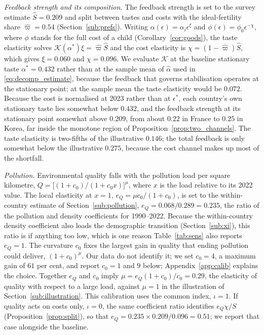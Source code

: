 \documentclass[11pt]{article}
\begin{document}
\emph{Feedback strength and its composition.} The feedback strength is set to the survey estimate
$\hat S=0.209$ and split between tastes and costs with the ideal-fertility share $\hat\varpi=0.54$
(Section~\ref{sub:prefs}). Writing $\alpha(\epsilon)=\alpha_i\epsilon^{\xi}$ and
$\phi(\epsilon)=\phi_0\epsilon^{-\chi}$, where $\phi$ stands for the full cost of a child
(Corollary~\ref{cor:goods}), the taste elasticity solves $\mathcal{K}(\alpha^\ast)\xi=\hat\varpi\hat S$
and the cost elasticity is $\chi=(1-\hat\varpi)\hat S$, which gives $\xi=0.060$ and $\chi=0.096$. We
evaluate $\mathcal{K}$ at the baseline stationary taste $\alpha^\ast=0.432$ rather than at the sample mean
of $\hat\alpha$ used in \eqref{eq:decomp_estimate}, because the feedback that governs stabilisation
operates at the stationary point; at the sample mean the taste elasticity would be $0.072$. Because the
cost is normalised at 2023 rather than at $\epsilon^\ast$, each country's own stationary taste lies
somewhat below $0.432$, and the feedback strength at its stationary point somewhat above $0.209$, from
about $0.22$ in France to $0.25$ in Korea, far inside the monotone region of
Proposition~\ref{prop:two_channels}. The taste elasticity is two-fifths of the illustrative $0.146$; the
total feedback is only somewhat below the illustrative $0.275$, because the cost channel makes up most of
the shortfall.

\emph{Pollution.} Environmental quality falls with the pollution load per square kilometre,
$Q=\big[(1+c_0)/(1+c_0x)\big]^{\mu}$, where $x$ is the load relative to its 2022 value. The local
elasticity at $x=1$, $e_Q=\mu c_0/(1+c_0)$, is set to the within-country estimate of
Section~\ref{sub:pollution}, $e_Q=0.068/0.289=0.235$, the ratio of the pollution and density
coefficients for 1990--2022. Because the within-country density coefficient also loads the demographic
transition (Section~\ref{sub:xi}), this ratio is if anything too low, which is one reason
Table~\ref{tab:sens} also reports $e_Q=1$. The curvature $c_0$ fixes the largest gain in quality that ending
pollution could deliver, $(1+c_0)^{\mu}$. Our data do not identify it; we set $c_0=4$, a maximum gain of
$61$ per cent, and report $c_0=1$ and $9$ below; Appendix~\ref{app:calib} explains the choice.
Together $e_Q$ and $c_0$ imply $\mu=e_Q(1+c_0)/c_0=0.29$, the elasticity of quality with respect to a
large load, against $\mu=1$ in the illustration of Section~\ref{sub:illustration}. This calibration uses the
common index, $\iota=1$. If quality acts on costs only, $\iota=0$, the same coefficient ratio identifies
$e_Q\chi/S$ (Proposition~\ref{prop:split}), so that $e_Q=0.235\times0.209/0.096=0.51$; we report that case
alongside the baseline.
\end{document}
